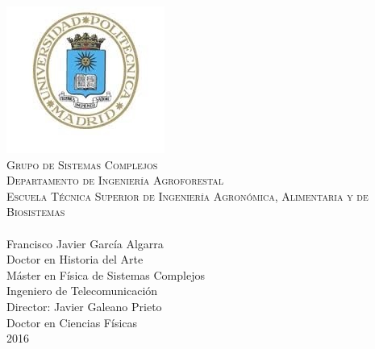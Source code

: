 \documentclass[
11pt, %
spanish, %
onehalfspacing, %
]{MastersDoctoralThesis_custom} %
\author{\textsc{Francisco Javier García Algarra}} %
\begin{document}
\frontmatter %

\pagestyle{plain} %

\begin{titlepage}
\begin{center}
\includegraphics[scale=0.6]{Figures/logoupm.jpg}
\\[0.5cm]
\textsc{\large Grupo de Sistemas Complejos}\\
\textsc{\large Departamento de Ingeniería Agroforestal}\\
\textsc{\large Escuela Técnica Superior de Ingeniería Agronómica, Alimentaria y de Biosistemas}\\[4cm]
{\huge \textsc \ttitle}\\[3cm]
{\Large Francisco Javier García Algarra}\\[0.15cm]
\small Doctor en Historia del Arte\\
\small Máster en Física de Sistemas Complejos\\
\small Ingeniero de Telecomunicación\\[1.0cm] 
\Large{{Director: }{Javier Galeano Prieto}}\\[0.15cm]
\small Doctor en Ciencias Físicas\\[2cm]
{\large 2016}\\[4cm] %
 
\vfill
\end{center}
\end{titlepage}
\end{document}
